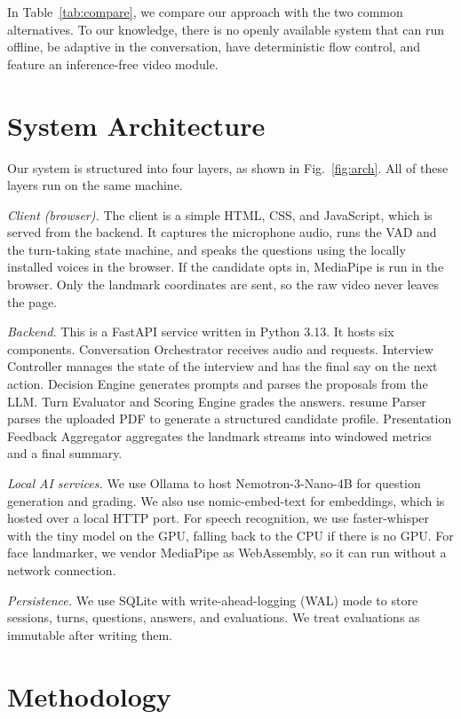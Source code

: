 \documentclass[conference]{IEEEtran}
\begin{document}
In Table~\ref{tab:compare}, we compare our approach with the two common alternatives. To our knowledge, there is no openly available system that can run offline, be adaptive in the conversation, have deterministic flow control, and feature an inference-free video module.

\section{System Architecture}\label{sec:arch}
Our system is structured into four layers, as shown in Fig.~\ref{fig:arch}. All of these layers run on the same machine.

\textit{Client (browser).} The client is a simple HTML, CSS, and JavaScript, which is served from the backend. It captures the microphone audio, runs the VAD and the turn-taking state machine, and speaks the questions using the locally installed voices in the browser. If the candidate opts in, MediaPipe is run in the browser. Only the landmark coordinates are sent, so the raw video never leaves the page.

\textit{Backend.} This is a FastAPI service written in Python 3.13. It hosts six components. Conversation Orchestrator receives audio and requests. Interview Controller manages the state of the interview and has the final say on the next action. Decision Engine generates prompts and parses the proposals from the LLM. Turn Evaluator and Scoring Engine grades the answers. resume Parser parses the uploaded PDF to generate a structured candidate profile. Presentation Feedback Aggregator aggregates the landmark streams into windowed metrics and a final summary.

\textit{Local AI services.} We use Ollama to host Nemotron-3-Nano-4B for question generation and grading. We also use nomic-embed-text for embeddings, which is hosted over a local HTTP port. For speech recognition, we use faster-whisper with the tiny model on the GPU, falling back to the CPU if there is no GPU. For face landmarker, we vendor MediaPipe as WebAssembly, so it can run without a network connection.

\textit{Persistence.} We use SQLite with write-ahead-logging (WAL) mode to store sessions, turns, questions, answers, and evaluations. We treat evaluations as immutable after writing them.

\section{Methodology}\label{sec:method}
\end{document}
